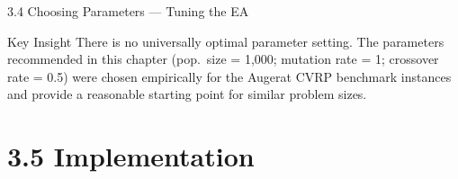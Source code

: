 \documentclass[aspectratio=169,10pt]{beamer}
\begin{document}
\begin{frame}[allowframebreaks]{3.4 Choosing Parameters — Tuning the EA}
  \begin{alertblock}{Key Insight}
    There is no universally optimal parameter setting.
    The parameters recommended in this chapter (pop.\ size = 1{,}000; mutation rate = 1;
    crossover rate = 0.5) were chosen empirically for the Augerat CVRP benchmark instances
    and provide a reasonable starting point for similar problem sizes.
  \end{alertblock}

\end{frame}

\section{3.5 Implementation}
\end{document}
